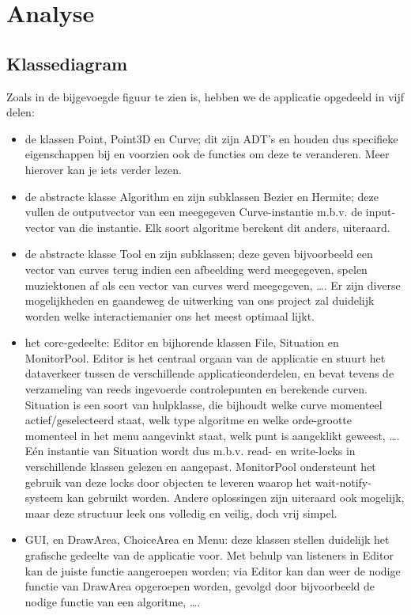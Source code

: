 \documentclass[a4paper,11pt,oneside, titlepage]{article}
\begin{document}
\section{Analyse}
\subsection{Klassediagram}
Zoals in de bijgevoegde figuur te zien is, hebben we de applicatie opgedeeld in vijf delen:
	\begin{itemize}
		\item de klassen Point, Point3D en Curve; dit zijn ADT's en houden dus specifieke eigenschappen bij en voorzien ook de functies om deze te veranderen. Meer hierover kan je iets verder lezen.
		\item de abstracte klasse Algorithm en zijn subklassen Bezier en Hermite; deze vullen de outputvector van een meegegeven Curve-instantie m.b.v. de input-vector van die instantie. Elk soort algoritme berekent dit anders, uiteraard.
		\item de abstracte klasse Tool en zijn subklassen; deze geven bijvoorbeeld een vector van curves terug indien een afbeelding werd meegegeven, spelen muziektonen af als een vector van curves werd meegegeven, \ldots . Er zijn diverse mogelijkheden en gaandeweg de uitwerking van ons project zal duidelijk worden welke interactiemanier ons het meest optimaal lijkt.
		\item het core-gedeelte: Editor en bijhorende klassen File, Situation en MonitorPool. Editor is het centraal orgaan van de applicatie en stuurt het dataverkeer tussen de verschillende applicatieonderdelen, en bevat tevens de verzameling van reeds ingevoerde controlepunten en berekende curven. Situation is een soort van hulpklasse, die bijhoudt welke curve momenteel actief/geselecteerd staat, welk type algoritme en welke orde-grootte momenteel in het menu aangevinkt staat, welk punt is aangeklikt geweest, \ldots . E\'en instantie van Situation wordt dus m.b.v. read- en write-locks in verschillende klassen gelezen en aangepast. MonitorPool ondersteunt het gebruik van deze locks door objecten te leveren waarop het wait-notify-systeem kan gebruikt worden. Andere oplossingen zijn uiteraard ook mogelijk, maar deze structuur leek ons volledig en veilig, doch vrij simpel.
		\item GUI, en DrawArea, ChoiceArea en Menu: deze klassen stellen duidelijk het grafische gedeelte van de applicatie voor. Met behulp van listeners in Editor kan de juiste functie aangeroepen worden; via Editor kan dan weer de nodige functie van DrawArea opgeroepen worden, gevolgd door bijvoorbeeld de nodige functie van een algoritme, \ldots .
 	\end{itemize}
\end{document}
